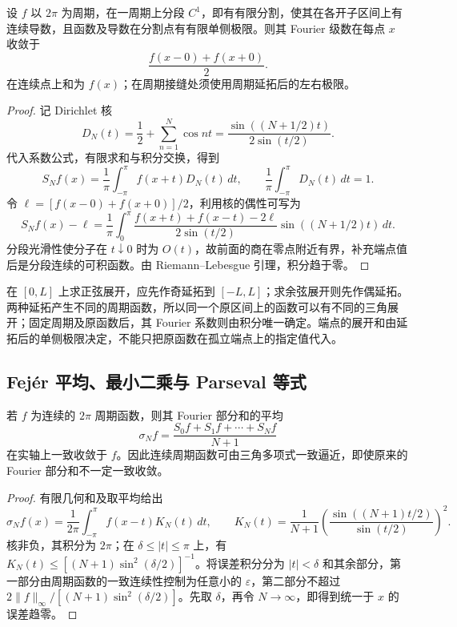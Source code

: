 \begin{theorem}
\label{thm:pei-fourier-dirichlet}
设 $f$ 以 $2\pi$ 为周期，在一周期上分段 $C^1$，即有有限分割，使其在各开子区间上有连续导数，且函数及导数在分割点有有限单侧极限。则其 Fourier 级数在每点 $x$ 收敛于
\[
 \frac{f(x-0)+f(x+0)}2.
\]
在连续点上和为 $f(x)$；在周期接缝处须使用周期延拓后的左右极限。
\end{theorem}
\begin{proof}
记 Dirichlet 核
\[
 D_N(t)=\frac12+\sum_{n=1}^{N}\cos nt
 =\frac{\sin((N+1/2)t)}{2\sin(t/2)}.
\]
代入系数公式，有限求和与积分交换，得到
\[
 S_Nf(x)=\frac1\pi\int_{-\pi}^{\pi}f(x+t)D_N(t)\,dt,
 \qquad \frac1\pi\int_{-\pi}^{\pi}D_N(t)\,dt=1.
\]
令 $\ell=[f(x-0)+f(x+0)]/2$，利用核的偶性可写为
\[
 S_Nf(x)-\ell
 =\frac1\pi\int_0^\pi
 \frac{f(x+t)+f(x-t)-2\ell}{2\sin(t/2)}
 \sin((N+1/2)t)\,dt.
\]
分段光滑性使分子在 $t\downarrow0$ 时为 $O(t)$，故前面的商在零点附近有界，补充端点值后是分段连续的可积函数。由 Riemann--Lebesgue 引理，积分趋于零。
\end{proof}

在 $[0,L]$ 上求正弦展开，应先作奇延拓到 $[-L,L]$；求余弦展开则先作偶延拓。两种延拓产生不同的周期函数，所以同一个原区间上的函数可以有不同的三角展开；固定周期及原函数后，其 Fourier 系数则由积分唯一确定。端点的展开和由延拓后的单侧极限决定，不能只把原函数在孤立端点上的指定值代入。

\subsection{Fejér 平均、最小二乘与 Parseval 等式}

\begin{theorem}
\label{thm:pei-fejer}
若 $f$ 为连续的 $2\pi$ 周期函数，则其 Fourier 部分和的平均
\[
 \sigma_Nf=\frac{S_0f+S_1f+\cdots+S_Nf}{N+1}
\]
在实轴上一致收敛于 $f$。因此连续周期函数可由三角多项式一致逼近，即使原来的 Fourier 部分和不一定一致收敛。
\end{theorem}
\begin{proof}
有限几何和及取平均给出
\[
 \sigma_Nf(x)=\frac1{2\pi}\int_{-\pi}^{\pi}f(x-t)K_N(t)\,dt,
 \qquad
 K_N(t)=\frac1{N+1}\left(\frac{\sin((N+1)t/2)}{\sin(t/2)}\right)^2.
\]
核非负，其积分为 $2\pi$；在 $\delta\leq|t|\leq\pi$ 上，有 $K_N(t)\leq[(N+1)\sin^2(\delta/2)]^{-1}$。将误差积分分为 $|t|<\delta$ 和其余部分，第一部分由周期函数的一致连续性控制为任意小的 $\varepsilon$，第二部分不超过 $2\|f\|_\infty/[(N+1)\sin^2(\delta/2)]$。先取 $\delta$，再令 $N\to\infty$，即得到统一于 $x$ 的误差趋零。
\end{proof}

